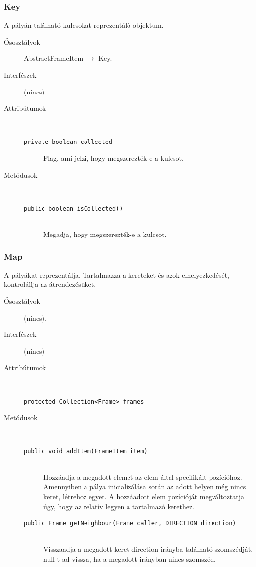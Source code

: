 		\subsubsection{Key}
				 A pályán található kulcsokat reprezentáló objektum. 			\begin{description}


				\item[Ősosztályok] AbstractFrameItem $\rightarrow{}$ Key.
				\item[Interfészek] (nincs)
				\item[Attribútumok]$\ $
					\begin{description}
						\item[\texttt{private boolean collected}] Flag, ami jelzi, hogy megszerezték-e a kulcsot. 
					\end{description}
				\item[Metódusok]$\ $
					\begin{description}
						\item[\texttt{public boolean isCollected()}] \hfill \\ Megadja, hogy megszerezték-e a kulcsot. 
					\end{description}
			\end{description}

		\subsubsection{Map}
				 A pályákat reprezentálja. Tartalmazza a kereteket és azok elhelyezkedését,  kontrolállja az átrendezésüket. 			\begin{description}


				\item[Ősosztályok] (nincs).
				\item[Interfészek] (nincs)
				\item[Attribútumok]$\ $
					\begin{description}
						\item[\texttt{protected Collection<Frame> frames}]%
					\end{description}
				\item[Metódusok]$\ $
					\begin{description}
						\item[\texttt{public void addItem(FrameItem item)}] \hfill \\ Hozzáadja a megadott elemet az elem által specifikált pozícióhoz.  Amennyiben a pálya inicializálása során az adott helyen még nincs keret,  létrehoz egyet.   A hozzáadott elem pozícióját megváltoztatja úgy, hogy az relatív  legyen a tartalmazó kerethez. 
						\item[\texttt{public Frame getNeighbour(Frame caller, DIRECTION direction)}] \hfill \\ Visszaadja a megadott keret direction irányba található  szomszédját. null-t ad vissza, ha a megadott irányban  nincs szomszéd. 
					\end{description}
			\end{description}

